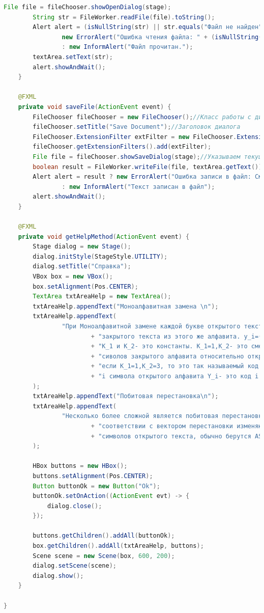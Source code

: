 \documentclass[a4paper,12pt]{article}
\begin{document}
\begin{lstlisting}[language=java, caption=код модуля MainWindowController.java]
        File file = fileChooser.showOpenDialog(stage);
        String str = FileWorker.readFile(file).toString();
        Alert alert = (isNullString(str) || str.equals("Файл не найден")) ?
                new ErrorAlert("Ошибка чтения файла: " + (isNullString(str) ? "Смотрите лог" : str))
                : new InformAlert("Файл прочитан.");
        textArea.setText(str);
        alert.showAndWait();
    }

    @FXML
    private void saveFile(ActionEvent event) {
        FileChooser fileChooser = new FileChooser();//Класс работы с диалогом выборки и сохранения 
        fileChooser.setTitle("Save Document");//Заголовок диалога 
        FileChooser.ExtensionFilter extFilter = new FileChooser.ExtensionFilter("txt files (*.txt)", "*.txt");//Расширение 
        fileChooser.getExtensionFilters().add(extFilter);
        File file = fileChooser.showSaveDialog(stage);//Указываем текущую сцену
        boolean result = FileWorker.writeFile(file, textArea.getText());
        Alert alert = result ? new ErrorAlert("Ошибка записи в файл: Смотрите лог")
                : new InformAlert("Текст записан в файл");
        alert.showAndWait();
    }

    @FXML
    private void getHelpMethod(ActionEvent event) {
        Stage dialog = new Stage();
        dialog.initStyle(StageStyle.UTILITY);
        dialog.setTitle("Справка");
        VBox box = new VBox();
        box.setAlignment(Pos.CENTER);
        TextArea txtAreaHelp = new TextArea();
        txtAreaHelp.appendText("Моноалфавитная замена \n");
        txtAreaHelp.appendText(
                "При Моноалфавитной замене каждой букве открытого текста ставится соответствие одна буква \n"
                        + "закрытого текста из этого же алфавита. y_i=(K_1 X_i+K_2 ) mod n, где: n-длинна алфавита\n"
                        + "К_1 и К_2- это константы. К_1=1,К_2- это смещение \n"
                        + "сиволов закрытого алфавита относительно открытого алфавита, \n"
                        + "если К_1=1,К_2=3, то это так называемый код Цезаря. X_i- это код \n"
                        + "i символа открытого алфавита Y_i- это код i символа закрытого алфавита. \n"
        );
        txtAreaHelp.appendText("Побитовая перестановка\n");
        txtAreaHelp.appendText(
                "Несколько более сложной является побитовая перестановка, при которой в \n"
                        + "соответствии с вектором перестановки изменяются позиции разрядов двоичного кода \n"
                        + "символов открытого текста, обычно берутся ASCII коды. \n"
        );

        HBox buttons = new HBox();
        buttons.setAlignment(Pos.CENTER);
        Button buttonOk = new Button("Ok");
        buttonOk.setOnAction((ActionEvent evt) -> {
            dialog.close();
        });

        buttons.getChildren().addAll(buttonOk);
        box.getChildren().addAll(txtAreaHelp, buttons);
        Scene scene = new Scene(box, 600, 200);
        dialog.setScene(scene);
        dialog.show();
    }

}
\end{lstlisting}
\end{document}
